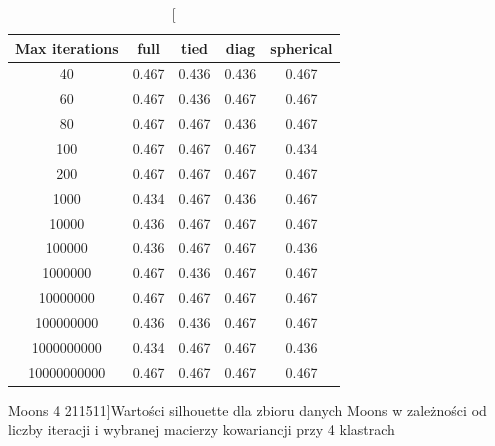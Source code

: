 \documentclass{classrep}
\begin{document}
{{            \begin{table}[]
                \begin{minipage}{1\textwidth}
                \centering
                \begin{tabular}{|c|c|c|c|c|}
                \hline
                Max iterations & full & tied & diag & spherical \\ \hline
                40 & 0.467 & 0.436 & 0.436 & 0.467 \\ \hline
                60 & 0.467 & 0.436 & 0.467 & 0.467 \\ \hline
                80 & 0.467 & 0.467 & 0.436 & 0.467 \\ \hline
                100 & 0.467 & 0.467 & 0.467 & 0.434 \\ \hline
                200 & 0.467 & 0.467 & 0.467 & 0.467 \\ \hline
                1000 & 0.434 & 0.467 & 0.436 & 0.467 \\ \hline
                10000 & 0.436 & 0.467 & 0.467 & 0.467 \\ \hline
                100000 & 0.436 & 0.467 & 0.467 & 0.436 \\ \hline
                1000000 & 0.467 & 0.436 & 0.467 & 0.467 \\ \hline
                10000000 & 0.467 & 0.467 & 0.467 & 0.467 \\ \hline
                100000000 & 0.436 & 0.436 & 0.467 & 0.467 \\ \hline
                1000000000 & 0.434 & 0.467 & 0.467 & 0.436 \\ \hline
                10000000000 & 0.467 & 0.467 & 0.467 & 0.467 \\ \hline
                \end{tabular}
                \caption
                [Moons 4 211511]{Wartości silhouette dla zbioru danych Moons w zależności od liczby iteracji i wybranej macierzy kowariancji przy 4 klastrach}
                \label{Moons_4_211511}
                \end{minipage}
                \hfill


\end{table}}}
\end{document}
